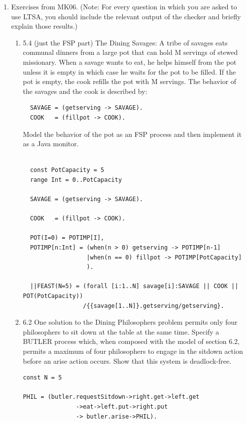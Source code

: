 \documentclass{article}
\begin{document}

\begin{enumerate}
\item Exercises from MK06. ({\sc Note}: For every question in which you are asked to use LTSA, you should include the relevant output of the checker and briefly explain those results.)
\begin{enumerate}
\item 5.4 (just the FSP part)
  The Dining Savages: A tribe of savages eats communal dinners from a large pot that can hold M servings of stewed missionary. When a savage wants to eat, he helps himself from the pot unless it is empty in which case he waits for the pot to be filled. If the pot is empty, the cook refills the pot with M servings. The behavior of the savages and the cook is described by:
  \begin{verbatim}
  SAVAGE = (getserving -> SAVAGE).
  COOK   = (fillpot -> COOK).
  \end{verbatim}
  Model the behavior of the pot as an FSP process and then implement it as a Java monitor. \\
  \\
  \begin{verbatim}
  const PotCapacity = 5
  range Int = 0..PotCapacity

  SAVAGE = (getserving -> SAVAGE).

  COOK   = (fillpot -> COOK).

  POT(I=0) = POTIMP[I],
  POTIMP[n:Int] = (when(n > 0) getserving -> POTIMP[n-1]
                  |when(n == 0) fillpot -> POTIMP[PotCapacity]
                  ).

  ||FEAST(N=5) = (forall [i:1..N] savage[i]:SAVAGE || COOK || POT(PotCapacity))
                 /{{savage[1..N]}.getserving/getserving}.
  \end{verbatim}
\item 6.2
  One solution to the Dining Philosophers problem permits only four philosophers to sit down at the table at the same time. Specify a BUTLER process which, when composed with the model of section 6.2, permits a maximum of four philosophers to engage in the sitdown action before an arise action occurs. Show that this system is deadlock-free.
\begin{verbatim}
const N = 5

PHIL = (butler.requestSitdown->right.get->left.get
               ->eat->left.put->right.put
               -> butler.arise->PHIL).


\end{verbatim}
\end{enumerate}
\end{enumerate}
\end{document}

